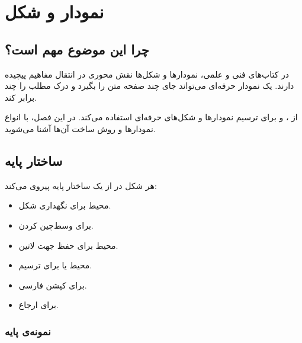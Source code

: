
\chapter{نمودار و شکل}
\label{chap:graphics}

\section{چرا این موضوع مهم است؟}
\label{sec:graphics-why}

در کتاب‌های فنی و علمی، نمودارها و شکل‌ها نقش
محوری در انتقال مفاهیم پیچیده دارند. یک نمودار
حرفه‌ای می‌تواند جای چند صفحه متن را بگیرد و
درک مطلب را چند برابر کند.

 از ،  و
 برای ترسیم نمودارها و شکل‌های
حرفه‌ای استفاده می‌کند. در این فصل، با انواع
نمودارها و روش ساخت آن‌ها آشنا می‌شوید.


\section{ساختار پایه}
\label{sec:graphics-basic}

هر شکل در  از یک ساختار پایه
پیروی می‌کند:

\begin{itemize}
    \item محیط  برای نگهداری شکل.
    \item {} برای وسط‌چین کردن.
    \item محیط  برای حفظ جهت لاتین.
    \item محیط  یا
     برای ترسیم.
    \item {} برای کپشن فارسی.
    \item {} برای ارجاع.
\end{itemize}


\subsection{نمونه‌ی پایه}
\label{sec:graphics-basic-example}

